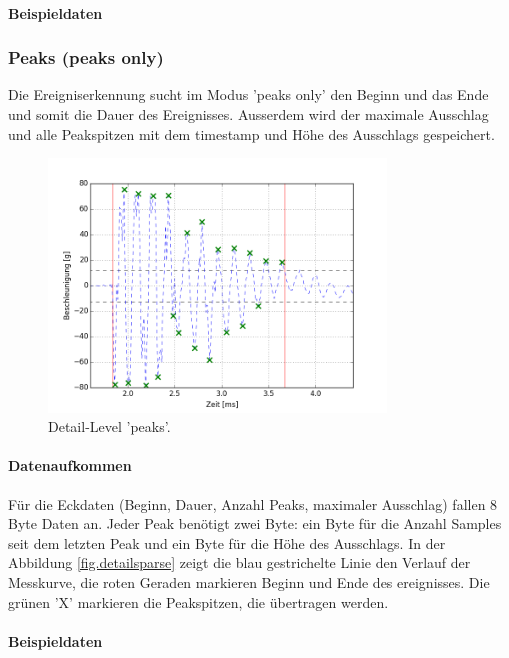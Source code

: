 \paragraph{Beispieldaten} 

\subsubsection{Peaks (peaks only)}
Die Ereigniserkennung sucht im Modus 'peaks only' den Beginn und das Ende und somit die Dauer des Ereignisses. Ausserdem wird der maximale Ausschlag und alle Peakspitzen mit dem \gls{timestamp} und Höhe des Ausschlags gespeichert.
\begin{figure}
	\centering
		\includegraphics[width=0.8\textwidth]{images/peaks.png}
	\caption{Detail-Level 'peaks'.}
	\label{fig.detailpeaks}
\end{figure}

\paragraph{Datenaufkommen} Für die Eckdaten (Beginn, Dauer, Anzahl Peaks, maximaler Ausschlag) fallen 8 Byte Daten an. Jeder Peak benötigt zwei Byte: ein Byte für die Anzahl Samples seit dem letzten Peak und ein Byte für die Höhe des Ausschlags. In der Abbildung \ref{fig.detailsparse} zeigt die blau gestrichelte Linie den Verlauf der Messkurve, die roten Geraden markieren Beginn und Ende des \gls{ereignis}ses. Die grünen 'X' markieren die Peakspitzen, die übertragen werden.

\paragraph{Beispieldaten} 

